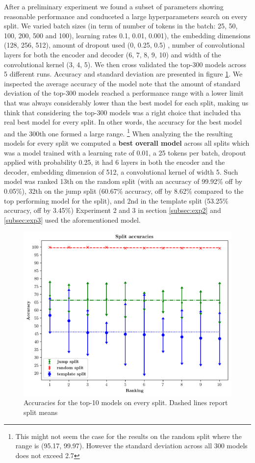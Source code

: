 After a preliminary experiment we found a subset of parameters showing reasonable performance and conduceted a large hyperparameters
search on every split.
We varied batch sizes (in term of number of tokens in the batch: 25, 50, 100, 200, 500 and 100), learning rates
0.1, 0.01, 0.001), the embedding dimensions (128, 256, 512), amount of dropout used (0, 0.25, 0.5) \cite{srivastava:eta:2014}, number of convolutional
layers for both the encoder and decoder (6, 7, 8, 9, 10) and width of the convolutional kernel (3, 4, 5).
We then cross validated the top-300 models across 5 different runs. Accuracy and standard deviation are presented in figure \ref{fig:exp1}. 
We inspected the average accuracy of the model note that the amount of standard deviation of the top-300 models reached a performance range with a lower limit that was always
considerably lower than the best model for each split, making us think that considering the top-300 models was
a right choice that included tha real best model for every split. In other words, the accuracy for the best model and the 300th one formed a large range.
\footnote{This might not seem the case for the results on the random split where the range is (95.17, 99.97). However the standard deviation across all 300 models does not
exceed 2.7}
When analyzing the the resulting models for every split we computed a \textbf{best overall model} across all splits which
was a model trained with a learning rate of 0.01, a 25 tokens per batch, dropout applied with probability 0.25, it had 6 layers in both the encoder and the decoder,
embedding dimension of 512, a convolutional kernel of width 5. Such model was ranked 13th on the random split (with an accuracy of 99.92\% off by 0.05\%), 
32th on the jump split (60.67\% accuracy, off by 8.62\% compared to the top performing model for the split),
and 2nd in the template split (53.25\% accuracy, off by 3.45\%)
Experiment 2 and 3 in section \ref{subsec:exp2} and \ref{subsec:exp3} used the aforementioned model.

\begin{figure}[h]
    \includegraphics[width=.5\textwidth,keepaspectratio]{figures/accuracies_all_splits.png}
    \centering
    \caption{Accuracies for the top-10 models on every split. Dashed lines report split means}
    \label{fig:exp1}
\end{figure}


